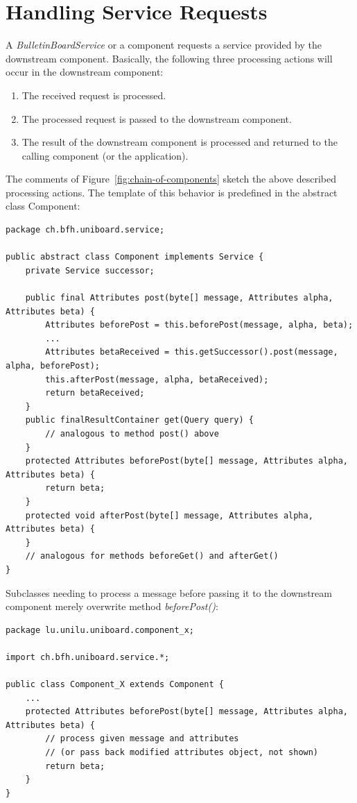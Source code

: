 \documentclass[oneside]{scrreprt}
\newcommand{\fig}[1]{Figure~\ref{#1}}
\begin{document}
\section{Handling Service Requests}

A \emph{BulletinBoardService} or a component requests a service provided by
the downstream component. Basically, the following three
processing actions will occur in the downstream component:

\begin{enumerate}
	\item The received request is processed.
	\item The processed request is passed to the downstream
		component.
	\item The result of the downstream component is
		processed and returned to the calling
		component (or the application).
\end{enumerate}

The comments of \fig{fig:chain-of-components} sketch
the above described processing actions. The template \cite{Gamma:1995:DPE:186897}
of this behavior is predefined in the abstract class Component:

\begin{lstlisting}[style=javastyle]
package ch.bfh.uniboard.service;

public abstract class Component implements Service {
    private Service successor;

	public final Attributes post(byte[] message, Attributes alpha, Attributes beta) {
		Attributes beforePost = this.beforePost(message, alpha, beta);
		...
		Attributes betaReceived = this.getSuccessor().post(message, alpha, beforePost);
		this.afterPost(message, alpha, betaReceived);
		return betaReceived;
	}
    public finalResultContainer get(Query query) {
        // analogous to method post() above
    }
    protected Attributes beforePost(byte[] message, Attributes alpha, Attributes beta) {
        return beta;
    }
    protected void afterPost(byte[] message, Attributes alpha, Attributes beta) {
    }
    // analogous for methods beforeGet() and afterGet()
}
\end{lstlisting}

Subclasses needing to process a message before passing it
to the downstream component merely overwrite method
\emph{beforePost()}:

\begin{lstlisting}[style=javastyle]
package lu.unilu.uniboard.component_x;

import ch.bfh.uniboard.service.*;

public class Component_X extends Component {
    ...
    protected Attributes beforePost(byte[] message, Attributes alpha, Attributes beta) {
        // process given message and attributes
        // (or pass back modified attributes object, not shown)
        return beta;
    }
}
\end{lstlisting}
\end{document}
